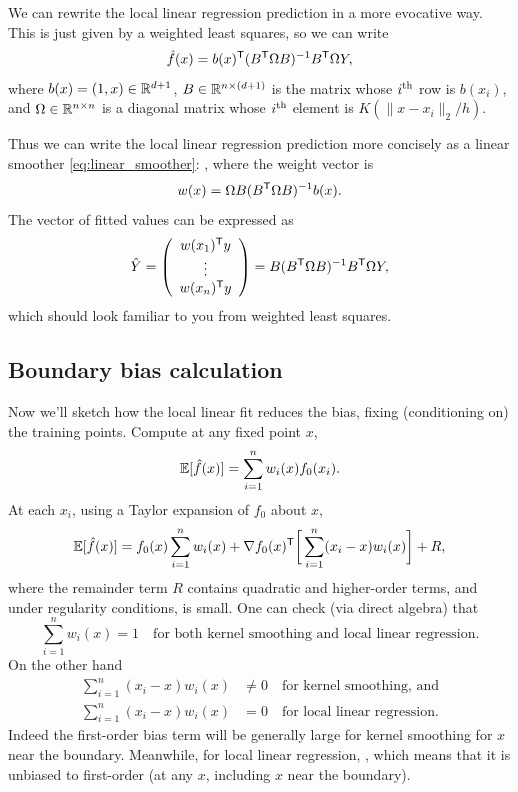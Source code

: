 \documentclass{article}
\begin{document}
We can rewrite the local linear regression prediction  in a more 
evocative way. This is just given by a weighted least squares, so we can write 
\[
\hat{f}(x) = b(x)^{\mathsf{T}} (B^{\mathsf{T}} \Omega B)^{-1} B^{\mathsf{T}} \Omega Y,
\]
where $b(x) = (1,x) \in \mathbb{R}^{d+1}$, $B \in \mathbb{R}^{n \times (d+1)}$ is the matrix
whose $i^{\text{th}}$ row is $b(x_i)$, and $\Omega \in \mathbb{R}^{n \times n}$ is a diagonal 
matrix whose $i^{\text{th}}$ element is $K(\|x-x_i\|_2/h)$. 

Thus we can write the local linear regression prediction more concisely as a
linear smoother \eqref{eq:linear_smoother}: , where
the weight vector is
\[
w(x) = \Omega B (B^{\mathsf{T}} \Omega B)^{-1} b(x).
\]
The vector of fitted values  can
be expressed as  
\[
\hat{Y} = 
\left(\begin{array}{c} 
w(x_1)^{\mathsf{T}} y \\ \vdots \\ w(x_n)^{\mathsf{T}} y
\end{array}\right)
= B (B^{\mathsf{T}} \Omega B)^{-1} B^{\mathsf{T}} \Omega Y,
\]
which should look familiar to you from weighted least squares.

\subsection{Boundary bias calculation}

Now we'll sketch how the local linear fit reduces the bias, fixing (conditioning
on) the training points. Compute at any fixed point $x$,  
\[
\mathbb{E}[\hat{f}(x)] = \sum_{i=1}^n w_i(x) f_0(x_i).
\]
At each $x_i$, using a Taylor expansion of $f_0$ about $x$,
\[
\mathbb{E}[\hat{f}(x)] = f_0(x) \sum_{i=1}^n w_i(x) + \nabla f_0(x)^{\mathsf{T}} \bigg[
\sum_{i=1}^n (x_i-x) w_i(x) \bigg] + R, 
\]
where the remainder term $R$ contains quadratic and higher-order terms, and
under regularity conditions, is small. One can check (via direct algebra) that
\[
\sum_{i=1}^n w_i(x) = 1 \quad \text{for both kernel smoothing and local linear
  regression}. 
\]
On the other hand 
\begin{align*}
\sum_{i=1}^n (x_i-x) w_i(x) &\not= 0 
\quad \text{for kernel smoothing, and} \\
\sum_{i=1}^n (x_i-x) w_i(x) &= 0 
\quad \text{for local linear regression}. 
\end{align*}
Indeed the first-order bias term  will be generally large for kernel smoothing for $x$ near the
boundary. Meanwhile, for local linear regression, , which means that it is unbiased to first-order (at any $x$, including $x$
near the boundary).    
\end{document}
